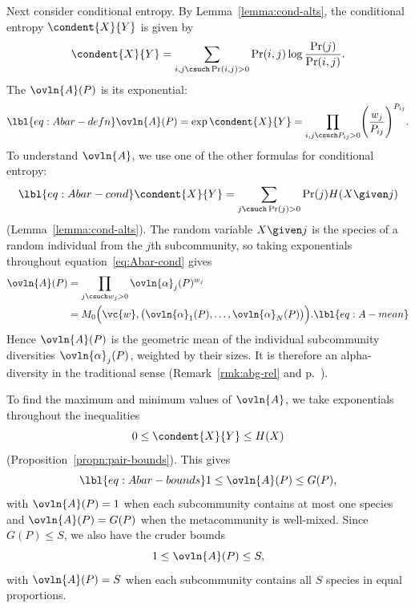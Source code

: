 Next consider conditional%
%
%  
entropy.  By Lemma~\ref{lemma:cond-alts}, the
conditional entropy $\condent{X}{Y}$ is given by
\[
\condent{X}{Y}
=
\sum_{i, j \csuch \Pr(i, j) > 0} 
\Pr(i, j) \log \frac{\Pr(j)}{\Pr(i, j)}.
\]
The  $\ovln{A}(P)$ is its
exponential: 
% 
\begin{equation}
\lbl{eq:Abar-defn}
\ovln{A}(P) 
=
\exp\condent{X}{Y}
=
\prod_{i, j \csuch P_{ij} > 0} 
\Biggl( \frac{w_j}{P_{ij}} \Biggr)^{P_{ij}}.
\end{equation}
% 
To understand $\ovln{A}$, we use one of the other formulas for conditional
entropy:
% 
\begin{equation}
\lbl{eq:Abar-cond}
\condent{X}{Y}
=
\sum_{j \csuch \Pr(j) > 0} \Pr(j) H(X \given j)
\end{equation}
% 
(Lemma~\ref{lemma:cond-alts}).  The random
variable $X \given j$ is the species of a random individual from the $j$th
subcommunity, so taking exponentials throughout
equation~\eqref{eq:Abar-cond} gives
% 
\begin{align}
\ovln{A}(P)        &
=
\prod_{j \csuch w_j > 0} \ovln{\alpha}_j(P)^{w_j}  
\nonumber       \\
&
=
M_0 \Bigl( 
\vc{w}, \bigl(\ovln{\alpha}_1(P), \ldots, \ovln{\alpha}_N(P)\bigr) 
\Bigr).
\lbl{eq:A-mean}
\end{align}
% 
Hence $\ovln{A}(P)$ is the geometric mean of the individual subcommunity
diversities $\ovln{\alpha}_j(P)$, weighted by their sizes.  It is therefore
an alpha-diversity in the traditional sense (Remark~\ref{rmk:abg-rel} and
p.~\pageref{p:alpha-ave}). 

To find the maximum and minimum values of $\ovln{A}$, we take exponentials
throughout the inequalities
\[
0 \leq \condent{X}{Y} \leq H(X)
\]
(Proposition~\ref{propn:pair-bounds}).  This gives
% 
\begin{equation}
\lbl{eq:Abar-bounds}
1 \leq \ovln{A}(P) \leq G(P),
\end{equation}
% 
with $\ovln{A}(P) = 1$ when each subcommunity contains at most one species
and $\ovln{A}(P) = G(P)$ when the metacommunity is well-mixed.  Since $G(P)
\leq S$, we also have the cruder bounds
\[
1 \leq \ovln{A}(P) \leq S,
\]
with $\ovln{A}(P) = S$ when each subcommunity contains all $S$ species in
equal proportions.

